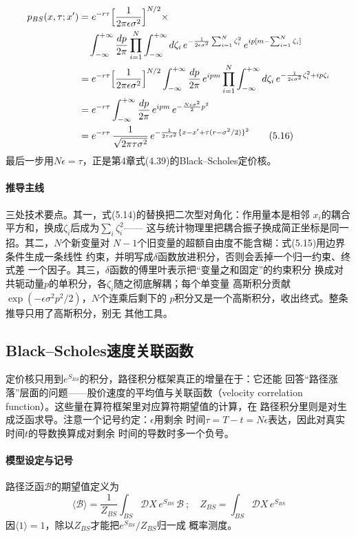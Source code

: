 \begin{align*}
p_{BS}(x,\tau;x')&=e^{-r\tau}\Bigl[\frac{1}{2\pi\epsilon\sigma^{2}}\Bigr]^{N/2}\times\\
&\quad\int_{-\infty}^{+\infty}\frac{dp}{2\pi}\prod_{i=1}^{N}\int_{-\infty}^{+\infty}
d\zeta_{i}\,e^{-\frac{1}{2\epsilon\sigma^{2}}\sum_{i=1}^{N}\zeta_{i}^{2}}\,
e^{ip[m-\sum_{i=1}^{N}\zeta_{i}]}\\
&=e^{-r\tau}\Bigl[\frac{1}{2\pi\epsilon\sigma^{2}}\Bigr]^{N/2}
\int_{-\infty}^{+\infty}\frac{dp}{2\pi}\,e^{ipm}
\prod_{i=1}^{N}\int_{-\infty}^{+\infty}d\zeta_{i}\,
e^{-\frac{1}{2\epsilon\sigma^{2}}\zeta_{i}^{2}+ip\zeta_{i}}\\
&=e^{-r\tau}\int_{-\infty}^{+\infty}\frac{dp}{2\pi}\,
e^{ipm}\,e^{-\frac{N\epsilon\sigma^{2}}{2}p^{2}}\\
&=e^{-r\tau}\,\frac{1}{\sqrt{2\pi\tau\sigma^{2}}}\,
e^{-\frac{1}{2\tau\sigma^{2}}\{x-x'+\tau(r-\sigma^{2}/2)\}^{2}}
\tag{5.16}
\end{align*}
最后一步用$N\epsilon=\tau$，正是第4章式(4.39)的Black--Scholes定价核。

\paragraph{推导主线}
三处技术要点。其一，式(5.14)的替换把二次型对角化：作用量本是相邻
$x_{i}$的耦合平方和，换成$\zeta_{i}$后成为$\sum_{i}\zeta_{i}^{2}$——
这与统计物理里把耦合振子换成简正坐标是同一招。其二，$N$个新变量对
$N-1$个旧变量的超额自由度不能含糊：式(5.15)用边界条件生成一条线性
约束，并明写成$\delta$函数放进积分，否则会丢掉一个归一约束、终式差
一个因子。其三，$\delta$函数的傅里叶表示把“变量之和固定”的约束积分
换成对共轭动量$p$的单积分，各$\zeta_{i}$随之彻底解耦；每个单变量
高斯积分贡献$\exp(-\epsilon\sigma^{2}p^{2}/2)$，$N$个连乘后剩下的
$p$积分又是一个高斯积分，收出终式。整条推导只用了高斯积分，别无
其他工具。

\subsection*{Black--Scholes速度关联函数}

定价核只用到$e^{S_{BS}}$的积分，路径积分框架真正的增量在于：它还能
回答“路径涨落”层面的问题——股价速度的平均值与关联函数（velocity
correlation function）。这些量在算符框架里对应算符期望值的计算，在
路径积分里则是对生成泛函求导。注意一个记号约定：$\epsilon$用剩余
时间$\tau=T-t=N\epsilon$表达，因此对真实时间$t$的导数换算成对剩余
时间的导数时多一个负号。

\paragraph{模型设定与记号}
路径泛函$\mathcal{B}$的期望值定义为
\begin{equation*}
\langle\mathcal{B}\rangle=\frac{1}{Z_{BS}}\int_{BS}\mathcal{D}X\,
e^{S_{BS}}\,\mathcal{B}\ ;\quad
Z_{BS}=\int_{BS}\mathcal{D}X\,e^{S_{BS}}
\tag{5.17}
\end{equation*}
因$\langle 1\rangle=1$，除以$Z_{BS}$才能把$e^{S_{BS}}/Z_{BS}$归一成
概率测度。

